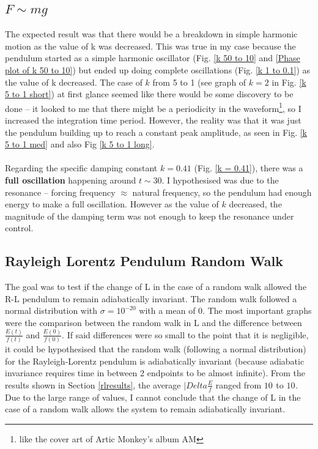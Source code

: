 \documentclass[10pt, twocolumn]{article}
\begin{document}
\subsection{$F \sim{mg}$}{\label{analysisFmg}}
The expected result was that there would be a breakdown in simple harmonic motion as the value of k was decreased. This was true in my case because the pendulum started as a simple harmonic oscillator (Fig. \ref{k 50 to 10} and \ref{Phase plot of k 50 to 10}) but ended up doing complete oscillations (Fig. \ref{k 1 to 0.1}) as the value of k decreased. The case of $k$ from 5 to 1 (see graph of $k = 2$ in Fig. \ref{k 5 to 1 short}) at first glance seemed like there would be some discovery to be done -- it looked to me that there might be a periodicity in the waveform\footnote{like the cover art of Artic Monkey's album AM}, so I increased the integration time period. However, the reality was that it was just the pendulum building up to reach a constant peak amplitude, as seen in Fig. \ref{k 5 to 1 med} and also Fig \ref{k 5 to 1 long}.\\
\\
Regarding the specific damping constant $k = 0.41$ (Fig. \ref{k = 0.41}), there was a \textbf{full oscillation} happening around $t \sim{30}$. I hypothesised was due to the resonance -- forcing frequency $\approx$ natural frequency, so the pendulum had enough energy to make a full oscillation. However as the value of $k$ decreased, the magnitude of the damping term was not enough to keep the resonance under control.

\subsection{Rayleigh Lorentz Pendulum Random Walk}
The goal was to test if the change of L in the case of a random walk allowed the R-L pendulum to remain adiabatically invariant. The random walk followed a normal distribution with $\sigma = 10^{-20}$ with a mean of 0. The most important graphs were the comparison between the random walk in L and the difference between $\frac{E(t)}{f(t)}$ and $\frac{E(0)}{f(0)}$. If said differences were so small to the point that it is negligible, it could be hypothesised that the random walk (following a normal distribution) for the Rayleigh-Lorentz pendulum is adiabatically invariant (because adiabatic invariance requires time in between 2 endpoints to be almost infinite). From the results shown in Section \ref{rlresults}, the average $|Delta\frac{E}{f}$ ranged from $10^{}$ to $10^{}$. Due to the large range of values, I cannot conclude that the change of L in the case of a random walk allows the system to remain adiabatically invariant.
\end{document}
